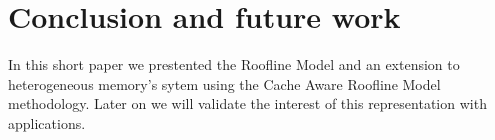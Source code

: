 \documentclass[runningheads,a4paper]{llncs}
\begin{document}





\section{Conclusion and future work}

In this short paper we prestented the Roofline Model and an extension to heterogeneous memory's sytem using the Cache Aware
Roofline Model methodology. Later on we will validate the interest of this representation with applications. 




\end{document}
